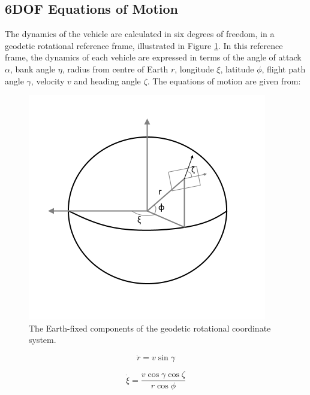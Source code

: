 \subsection{6DOF Equations of Motion}


The dynamics of the vehicle are calculated in six degrees of freedom, in a geodetic rotational reference frame, illustrated in Figure \ref{fig:global}. In this reference frame, the dynamics of each vehicle are expressed in terms of the angle of attack $\alpha$, bank angle $\eta$, radius from centre of Earth $r$, longitude $\xi$, latitude $\phi$, flight path angle $\gamma$, velocity $v$ and heading angle $\zeta$. The equations of motion are given from\cite{Josselyn2002a}:
\begin{figure}[ht]
	\centering
	\includegraphics[width=0.7\linewidth]{figures/4_LODESTAR/global}
	\caption{The Earth-fixed components of the geodetic rotational coordinate system.}
	\label{fig:global}
\end{figure}


\begin{equation}
\dot{r} = v \sin \gamma
\end{equation}

\begin{equation}
\dot{\xi} = \frac{v\cos \gamma \cos \zeta}{r \cos \phi}
\end{equation}

